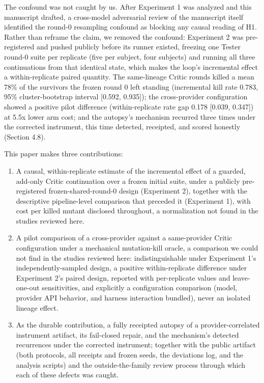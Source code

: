 \documentclass[
  11pt,
]{article}
\providecommand{\tightlist}{%
  \setlength{\itemsep}{0pt}\setlength{\parskip}{0pt}}
\begin{document}
The confound was not caught by us. After Experiment 1 was analyzed and
this manuscript drafted, a cross-model adversarial review of the
manuscript itself identified the round-0 resampling confound as blocking
any causal reading of H1. Rather than reframe the claim, we removed the
confound: Experiment 2 was pre-registered and pushed publicly before its
runner existed, freezing one Tester round-0 suite per replicate (five
per subject, four subjects) and running all three continuations from
that identical state, which makes the loop's incremental effect a
within-replicate paired quantity. The same-lineage Critic rounds killed
a mean 78\% of the survivors the frozen round 0 left standing
(incremental kill rate 0.783, 95\% cluster-bootstrap interval {[}0.592,
0.935{]}); the cross-provider configuration showed a positive pilot
difference (within-replicate rate gap 0.178 {[}0.039, 0.347{]}) at 5.5x
lower arm cost; and the autopsy's mechanism recurred three times under
the corrected instrument, this time detected, receipted, and scored
honestly (Section 4.8).

This paper makes three contributions:

\begin{enumerate}
\def\labelenumi{\arabic{enumi}.}
\tightlist
\item
  A causal, within-replicate estimate of the incremental effect of a
  guarded, add-only Critic continuation over a frozen initial suite,
  under a publicly pre-registered frozen-shared-round-0 design
  (Experiment 2), together with the descriptive pipeline-level
  comparison that preceded it (Experiment 1), with cost per killed
  mutant disclosed throughout, a normalization not found in the studies
  reviewed here.
\item
  A pilot comparison of a cross-provider against a same-provider Critic
  configuration under a mechanical mutation-kill oracle, a comparison we
  could not find in the studies reviewed here: indistinguishable under
  Experiment 1's independently-sampled design, a positive
  within-replicate difference under Experiment 2's paired design,
  reported with per-replicate values and leave-one-out sensitivities,
  and explicitly a configuration comparison (model, provider API
  behavior, and harness interaction bundled), never an isolated lineage
  effect.
\item
  As the durable contribution, a fully receipted autopsy of a
  provider-correlated instrument artifact, its fail-closed repair, and
  the mechanism's detected recurrences under the corrected instrument;
  together with the public artifact (both protocols, all receipts and
  frozen seeds, the deviations log, and the analysis scripts) and the
  outside-the-family review process through which each of these defects
  was caught.
\end{enumerate}
\end{document}

